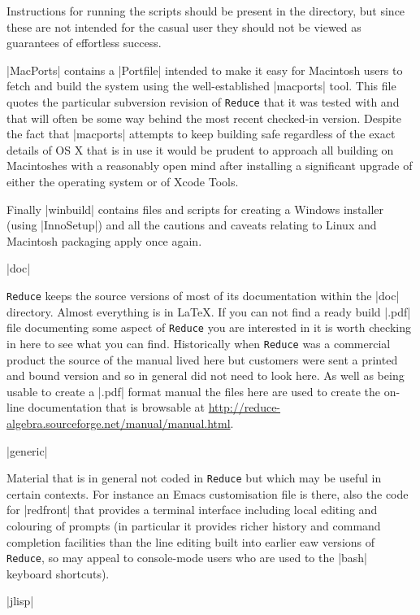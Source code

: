 \documentclass[12pt,twoside,openright]{memoir}
\newcommand{\reduce}{\texttt{Reduce}\xspace}
\begin{document}
\begin{description}
Instructions for running the scripts should be present in the directory,
but since these are not intended for the casual user they should not
be viewed as guarantees of effortless success.

|MacPorts| contains a |Portfile| intended to make it easy for
Macintosh users to fetch and build the system using the well-established
|macports| tool. This file quotes the particular subversion revision of
\reduce that it was tested with and that will often be some way behind the
most recent checked-in version. Despite the fact that |macports| attempts to
keep building safe regardless of the exact details of OS X that is in use
it would be prudent to approach all building on Macintoshes with a reasonably
open mind after installing a significant upgrade of either the operating
system or of Xcode Tools.

Finally |winbuild| contains files and scripts for creating a Windows installer
(using |InnoSetup|) and all the cautions and caveats relating to Linux and
Macintosh packaging apply once again.

\item |doc|

\reduce keeps the source versions of most of its documentation within the
|doc| directory. Almost everything is in \LaTeX. If you can not find a ready
build |.pdf| file documenting some aspect of \reduce you are interested in it
is worth checking in here to see what you can find. Historically when
\reduce was a commercial product the source of the manual lived here
but customers were sent a printed and bound version and so in general did
not need to look here. As well as being usable to create a |.pdf| format
manual the files here are used to create the on-line documentation
that is browsable at
\url{http://reduce-algebra.sourceforge.net/manual/manual.html}.

\item |generic|

Material that is in general not coded in \reduce but which may be useful
in certain contexts. For instance an Emacs customisation file is there,
also the code for |redfront| that provides a terminal interface including
local editing and colouring of prompts (in particular it provides richer
history and command completion facilities than the line editing built into
earlier eaw versions of \reduce, so may appeal to console-mode users who are
used to the |bash| keyboard shortcuts).

\item |jlisp|


\end{description}
\end{document}
